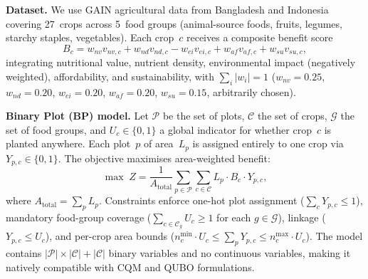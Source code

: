 \documentclass[conference]{IEEEtran}
\begin{document}
\textbf{Dataset.}
We use GAIN agricultural data from Bangladesh and Indonesia covering 27~crops across 5~food groups (animal-source foods, fruits, legumes, starchy staples, vegetables).
Each crop~$c$ receives a composite benefit score
\begin{equation}
B_c = w_{nv}v_{nv,c} + w_{nd}v_{nd,c} - w_{ei}v_{ei,c} + w_{af}v_{af,c} + w_{su}v_{su,c},
\label{eq:benefit}
\end{equation}
integrating nutritional value, nutrient density, environmental impact (negatively weighted), affordability, and sustainability, with $\sum_i|w_i|{=}1$ ($w_{nv}{=}0.25$, $w_{nd}{=}0.20$, $w_{ei}{=}0.20$, $w_{af}{=}0.20$, $w_{su}{=}0.15$, arbitrarily chosen).

\textbf{Binary Plot (BP) model.}
Let $\mathcal{P}$ be the set of plots, $\mathcal{C}$ the set of crops, $\mathcal{G}$ the set of food groups, and $U_c\!\in\!\{0,1\}$ a global indicator for whether crop~$c$ is planted anywhere.
Each plot~$p$ of area~$L_p$ is assigned entirely to one crop via $Y_{p,c}\!\in\!\{0,1\}$.
The objective maximises area-weighted benefit:
\begin{equation}
\max\; Z = \frac{1}{A_{\text{total}}} \sum_{p \in \mathcal{P}}\sum_{c \in \mathcal{C}} L_p \cdot B_c \cdot Y_{p,c},
\label{eq:bp}
\end{equation}
where $A_{\text{total}}{=}\sum_{p} L_p$.
Constraints enforce one-hot plot assignment ($\sum_c Y_{p,c} \leq 1$), mandatory food-group coverage ($\sum_{c \in \mathcal{C}_g} U_c \geq 1$ for each $g\!\in\!\mathcal{G}$), linkage ($Y_{p,c} \leq U_c$), and per-crop area bounds ($n_c^{\min} \cdot U_c \leq \sum_{p} Y_{p,c} \leq n_c^{\max} \cdot U_c$).
The model contains $|\mathcal{P}|{\times}|\mathcal{C}|{+}|\mathcal{C}|$ binary variables and no continuous variables, making it natively compatible with CQM and QUBO formulations.
\end{document}
